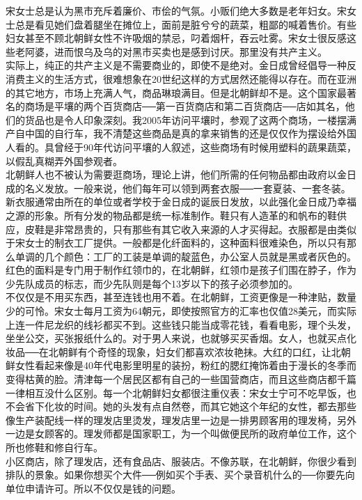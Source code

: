 宋女士总是认为黑市充斥着廉价、市侩的气氛。小贩们绝大多数是老年妇女。宋女士总是看见她们盘着腿坐在摊位上，面前是脏兮兮的蔬菜，粗鄙的喊着售价。有些妇女甚至不顾北朝鲜女性不许吸烟的禁忌，叼着烟杆，吞云吐雾。宋女士很反感这些老阿婆，进而恨乌及乌的对黑市买卖也是感到讨厌。那里没有共产主义。\\

实际上，纯正的共产主义是不需要商业的，即使不是绝对。金日成曾经倡导一种反消费主义的生活方式，很难想象在20世纪这样的方式居然还能得以存在。而在亚洲的其它地方，市场上充满人气，商品琳琅满目。但是北朝鲜却不是。这个国家最著名的商场是平壤的两个百货商店──第一百货商店和第二百货商店──店如其名，他们的货品也是令人印象深刻。我2005年访问平壤时，参观了这两个商场，一楼摆满产自中国的自行车，我不清楚这些商品是真的拿来销售的还是仅仅作为摆设给外国人看的。具曾经于90年代访问平壤的人叙述，这些商场有时候用塑料的蔬果蔬菜，以假乱真糊弄外国参观者。\\

北朝鲜人也不被认为需要逛商场，理论上讲，他们所需的任何物品都由政府以金日成的名义发放。一般来说，他们每年可以领到两套衣服──一套夏装、一套冬装。新衣服通常由所在的单位或者学校于金日成的诞辰日发放，以此强化金日成乃幸福之源的形象。所有分发的物品都是统一标准制作。鞋只有人造革的和帆布的鞋供应，皮鞋是非常昂贵的，只有那些有其它收入来源的人才买得起。衣服都是由类似于宋女士的制衣工厂提供。一般都是化纤面料的，这种面料很难染色，所以只有那么单调的几个颜色：工厂的工装是单调的靛蓝色，办公室人员就是黑或者灰色的。红色的面料是专门用于制作红领巾的，在北朝鲜，红领巾是孩子们围在脖子，作为少先队成员的标志，而少先队则是每个13岁以下的孩子必须参加的。\\

不仅仅是不用买东西，甚至连钱也用不着。在北朝鲜，工资更像是一种津贴，数量少的可怜。宋女士每月工资为64朝元，即使按照官方的汇率也仅值28美元，而实际上连一件尼龙织的线衫都买不到。这些钱只能当成零花钱，看看电影，理个头发，坐坐公交，买张报纸什么的。对于男人来说，也就够买买香烟。女人，也就买点化妆品──在北朝鲜有个奇怪的现象，妇女们都喜欢浓妆艳抹。大红的口红，让北朝鲜女性看起来像是40年代电影里明星的装扮，粉红的腮红掩饰着由于漫长的冬季而变得枯黄的脸。清津每一个居民区都有自己的一些国营商店，而且这些商店都千篇一律相互没什么区别。每一个北朝鲜妇女都很注重仪表：宋女士宁可不吃早饭，也不会省下化妆的时间。她的头发有点自然卷，而其它她这个年纪的女性，都去那些像生产装配线一样的理发店里烫发，理发店里一边是一排男顾客用的理发椅，另外一边是女顾客的。理发师都是国家职工，为一个叫做便民所的政府单位工作，这个所也修鞋和修自行车。\\

小区商店，除了理发店，还有食品店、服装店。不像苏联，在北朝鲜，你很少看到排队的景象。如果你想买个大件──例如买个手表、买个录音机什么的──你要先向单位申请许可。所以不仅仅是钱的问题。\\

